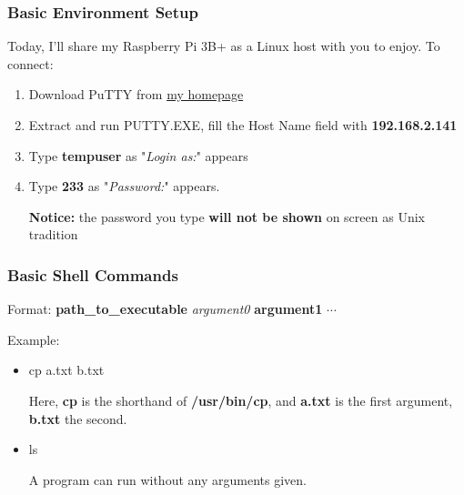 \documentclass[11pt]{beamer}
\begin{document}
\begin{frame}
\frametitle{Basic Environment Setup}
Today, I'll share my Raspberry Pi 3B+ as a Linux host with you to enjoy.
To connect:
\begin{enumerate}
\item Download PuTTY from \href{http://home.ustc.edu.cn/~jauntyliu/}{my homepage}
\item Extract and run PUTTY.EXE, fill the Host Name field with \textbf{192.168.2.141}
\item Type \textbf{tempuser} as "\textit{Login as:}" appears
\item Type \textbf{233} as "\textit{Password:}" appears.

\textbf{Notice:} the password you type \textbf{will not be shown} on screen as Unix tradition



\end{enumerate}
\end{frame}

\begin{frame}
\frametitle{Basic Shell Commands}
Format:
\textbf{path\_to\_executable} \textit{argument0} \textbf{argument1} $\cdots$

Example:
\begin{itemize}
\item cp a.txt b.txt

Here, \textbf{cp} is the shorthand of \textbf{/usr/bin/cp}, and \textbf{a.txt} is the first argument, \textbf{b.txt} the second.
\item ls

A program can run without any arguments given.
\end{itemize}
\end{frame}
\end{document}
